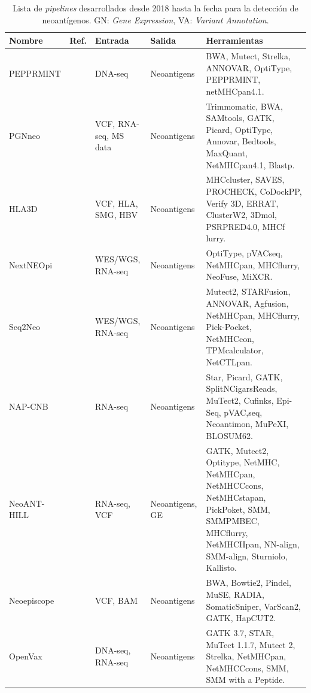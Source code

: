 \begin{table}[h]
	\caption{Lista de \textit{pipelines} desarrollados desde 2018 hasta la fecha para la detección de neoantígenos. GN: \textit{Gene Expression}, VA: \textit{Variant Annotation}.}
	\label{tab:review_pipelines}
	\centering
	\setlength{\tabcolsep}{0.5em} %
	{\renewcommand{\arraystretch}{1.5}%
		{\scriptsize
			\begin{tabular}{lp{2cm}p{2cm}p{2cm}p{5cm}}
				\textbf{Nombre} &  \textbf{Ref.} & \textbf{Entrada} & \textbf{Salida} & \textbf{Herramientas} \\ \hline
				PEPPRMINT &  \cite{zhou2023prioritizing} & DNA-seq & Neoantigens & BWA, Mutect, Strelka, ANNOVAR, OptiType, PEPPRMINT, netMHCpan4.1. \\
				PGNneo &  \cite{tan2023pgnneo}	& VCF, RNA-seq, MS data & Neoantigens & Trimmomatic, BWA, SAMtools, GATK, Picard, OptiType, Annovar, Bedtools, MaxQuant, NetMHCpan4.1, Blastp. \\
				HLA3D &  \cite{li2022hla3d} & VCF, HLA, SMG, HBV & Neoantigens & MHCcluster, SAVES, PROCHECK, CoDockPP, Verify 3D, ERRAT, ClusterW2, 3Dmol, PSRPRED4.0, MHCf lurry. \\
				NextNEOpi &  \cite{dietmar2022nextneopi} & WES/WGS, RNA-seq & Neoantigens & OptiType, pVACseq, NetMHCpan, MHCflurry, NeoFuse, MiXCR. \\
				Seq2Neo &  \cite{Kaixuan2022seq2neo} & WES/WGS, RNA-seq & Neoantigens & Mutect2, STARFusion, ANNOVAR, Agfusion, NetMHCpan, MHCflurry, Pick-Pocket, NetMHCcon, TPMcalculator, NetCTLpan. \\
				NAP-CNB & \cite{wert2021predicting} & RNA-seq & Neoantigens & Star, Picard, GATK, SplitNCigarsReads, MuTect2, Cufinks, Epi-Seq, pVAC,seq, Neoantimon, MuPeXI, BLOSUM62. \\
				NeoANT-HILL & \cite{coelho2020neoant} & RNA-seq, VCF  & Neoantigens, GE & GATK, Mutect2, Optitype, NetMHC, NetMHCpan, NetMHCCcons, NetMHCstapan, PickPoket, SMM, SMMPMBEC, MHCflurry, NetMHCIIpan, NN-align, SMM-align, Sturniolo, Kallisto. \\
				Neoepiscope & \cite{wood2020neoepiscope} & VCF, BAM & Neoantigens & BWA, Bowtie2, Pindel, MuSE, RADIA, SomaticSniper, VarScan2, GATK, HapCUT2. \\
				OpenVax &  \cite{kodysh2020openvax} & DNA-seq, RNA-seq & Neoantigens & GATK 3.7, STAR, MuTect 1.1.7, Mutect 2, Strelka, NetMHCpan, NetMHCCcons, SMM, SMM with a Peptide. \\

\end{tabular}}}
\end{table}
